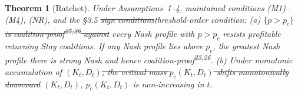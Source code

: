 \documentclass[12pt]{article}
\newtheorem{theorem}{Theorem}
\theoremstyle{definition}
\theoremstyle{remark}
\providecommand{\DIFaddtex}[1]{{\color{AddedText}#1}}
\providecommand{\DIFdeltex}[1]{{\color{DeletedText}\sout{#1}}}
\providecommand{\DIFaddbegin}{}
\providecommand{\DIFaddend}{}
\providecommand{\DIFdelbegin}{}
\providecommand{\DIFdelend}{}
\providecommand{\DIFadd}[1]{\texorpdfstring{\DIFaddtex{#1}}{#1}} %
\providecommand{\DIFdel}[1]{\texorpdfstring{\DIFdeltex{#1}}{}} %
\begin{document}
\DIFaddend \begin{theorem}[Ratchet]
Under Assumptions~1--4, maintained conditions (M1)--(M4), \DIFaddbegin \DIFadd{(NR), }\DIFaddend and the \S3.5 \DIFdelbegin \DIFdel{sign conditions}\DIFdelend \DIFaddbegin \DIFadd{threshold-order condition}\DIFaddend : (a) \DIFdelbegin \DIFdel{$\{p > p_c\}$
is coalition-proof\textsuperscript{25,26} against }\DIFdelend \DIFaddbegin \DIFadd{every Nash profile with $p>p_c$ resists profitable }\DIFaddend returning Stay coalitions. \DIFaddbegin \DIFadd{If any Nash profile lies above $p_c$, the greatest Nash profile there is strong Nash and hence coalition-proof\textsuperscript{25,26}. }\DIFaddend (b) Under monotonic accumulation of \DIFdelbegin \DIFdel{$(K_t, D_t)$, the critical mass
$p_c(K_t, D_t)$ shifts monotonically downward }\DIFdelend \DIFaddbegin \DIFadd{$(K_t,D_t)$, $p_c(K_t,D_t)$ is non-increasing }\DIFaddend in $t$.
\end{theorem}
\end{document}
